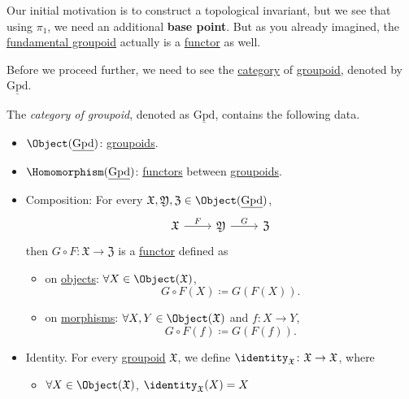\hr

Our initial motivation is to construct a topological invariant, but we see that using \(\pi _1\), we need an additional \textbf{base point}. But as you already
imagined, the \hyperref[def:fundamental-groupoid]{fundamental groupoid} actually is a \hyperref[def:functor]{functor} as well.

Before we proceed further, we need to see the \hyperref[def:category]{category} of \hyperref[def:groupoid]{groupoid}, denoted by \(\underline{\mathrm{Gpd}}\).

\begin{definition}\label{def:category-of-groupoid}
	The \emph{category of groupoid}, denoted as \(\underline{\mathrm{Gpd}}\), contains the following data.
	\begin{itemize}
		\item \(\Object (\underline{\mathrm{Gpd}})\): \hyperref[def:groupoid]{groupoids}.
		\item \(\Homomorphism (\underline{\mathrm{Gpd}})\): \hyperref[def:functor]{functors} between \hyperref[def:groupoid]{groupoids}.
		\item Composition: For every \(\mathfrak{X} , \mathfrak{Y}, \mathfrak{Z} \in \Object (\underline{\mathrm{Gpd}})\),
		      \[
			      \begin{tikzcd}
				      {\mathfrak{X}} & {\mathfrak{Y}} & {\mathfrak{Z}}
				      \arrow["F", from=1-1, to=1-2]
				      \arrow["G", from=1-2, to=1-3]
			      \end{tikzcd}
		      \]
		      then \(G\circ F\colon \mathfrak{X} \to \mathfrak{Z}\) is a \hyperref[def:functor]{functor} defined as
		      \begin{itemize}
			      \item on \hyperref[def:object]{objects}: \(\forall X\in \Object (\mathfrak{X})\),
			            \[
				            G\circ F(X)\coloneqq G(F(X)).
			            \]
			      \item on \hyperref[def:morphism]{morphisms}: \(\forall X, Y\in \Object (\mathfrak{X})\) and \(f\colon X\to Y\),
			            \[
				            G\circ F(f)\coloneqq G(F(f)).
			            \]
		      \end{itemize}
		\item Identity. For every \hyperref[def:groupoid]{groupoid} \(\mathfrak{X}\), we define \(\identity_{\mathfrak{X}}\colon \mathfrak{X}\to \mathfrak{X} \), where
		      \begin{itemize}
			      \item \(\forall X\in \Object (\mathfrak{X})\), \(\identity_{\mathfrak{X}}(X) = X \)

\end{itemize}
\end{itemize}
\end{definition}
